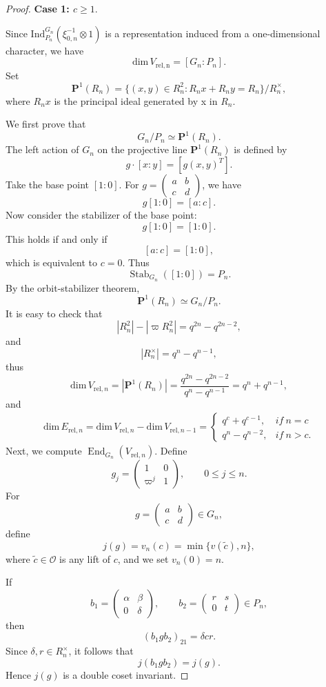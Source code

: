 \documentclass[11pt]{amsart}
\renewcommand{\rm}{\mathrm}
\theoremstyle{definition}
\numberwithin{equation}{section}
\begin{document}
	\begin{proof}
		\textbf{Case 1: \(c\ge1\)}.
		
		
		Since \(\rm{Ind}_{P_n}^{G_n}(\xi_{0,n}^{-1}\otimes 1)\) is a representation induced from a one-dimensional character, we have 
		\[\rm{dim}\,V_{\rm{rel,n}}=[G_n:P_n].\]
		Set \[\mathbf{P}^1(R_n) = \{ (x, y) \in R_n^2 : R_nx + R_ny = R_n \} / R_n^\times,\]where \(R_nx\) is the principal ideal generated by x in \(R_n\).
		
		
		We first prove that \[G_n/P_n\simeq \mathbf{P}^1(R_n).\]
		The left action of \(G_n\) on the projective line \(\mathbf{P}^1(R_n)\) is defined by
		\[
		g\cdot[x : y]= [g(x, y)^T].
		\]
		Take the base point \([1 : 0]\). For \(g = \begin{pmatrix} a & b \\ c & d \end{pmatrix}\), we have
		\[
		g[1 : 0]= [a : c].
		\]
		Now consider the stabilizer of the base point:
		\[
		g[1 : 0]= [1 : 0].
		\]
		This holds if and only if
		\[
		[a : c] = [1 : 0],
		\]
		which is equivalent to \(c = 0\). Thus
		\[
		\operatorname{Stab}_{G_n}([1: 0]) = P_n.
		\]
		By the orbit-stabilizer theorem,
		\[
		\mathbf{P}^1(R_n) \simeq G_n/P_n.
		\]It is easy to check that 
		\[|R_n^2|-|\varpi R_n^2|=q^{2n}-q^{2n-2},\]and
		\[|R_n^\times|=q^{n}-q^{n-1},\]
		thus \[\rm{dim}\,V_{\rm{rel},n}=|\mathbf{P}^1(R_n)|=\frac{q^{2n}-q^{2n-2}}{q^{n}-q^{n-1}}=q^{n}+q^{n-1},\]and 
		\begin{align*}
			\rm{dim}\,E_{\rm{rel},n}=\rm{dim}\,V_{\rm{rel},n}-\rm{dim}\,V_{\rm{rel},n-1}=\begin{cases}
				q^c+q^{c-1},&if\ n=c\\
				q^n-q^{n-2},&if\ n>c.
			\end{cases}
		\end{align*}
		Next, we compute
		\(
		\operatorname{End}_{G_n}(V_{\rm{rel},n}).
		\) Define \[g_j = \begin{pmatrix} 1 & 0 \\ \varpi^j & 1 \end{pmatrix}, \qquad 0 \leq j \leq n.\]
		For
		\[
		g = \begin{pmatrix} a & b \\ c & d \end{pmatrix} \in G_n,
		\]
		define
		\[
		j(g) = v_n(c) = \min\{v(\tilde{c}), n\},
		\]
		where \(\tilde{c} \in \mathcal{O}\) is any lift of \(c\), and we set \(v_n(0) = n\).
		
		If
		\[
		b_1 = \begin{pmatrix} \alpha & \beta \\ 0 & \delta \end{pmatrix}, \qquad b_2 = \begin{pmatrix} r & s \\ 0 & t \end{pmatrix} \in P_n,
		\]
		then
		\[
		(b_1 g b_2)_{21} = \delta c r.
		\]
		Since \(\delta, r \in R_n^\times\), it follows that
		\[
		j(b_1 g b_2) = j(g).
		\]
		Hence \(j(g)\) is a double coset invariant.
		

\end{proof}
\end{document}
